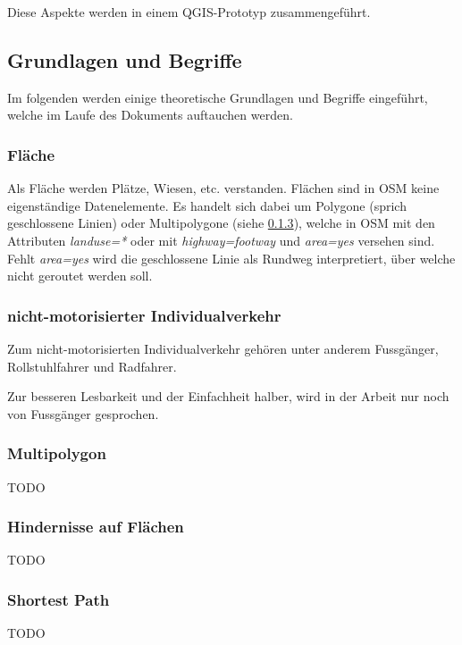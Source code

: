 Diese Aspekte werden in einem QGIS-Prototyp zusammengeführt.


\subsection{Grundlagen und Begriffe}
\label{Grundlagen und Begriffe}

Im folgenden werden einige theoretische Grundlagen und Begriffe eingeführt, welche im Laufe des Dokuments auftauchen werden.


\subsubsection{Fläche}
\label{Fläche}

Als Fläche werden Plätze, Wiesen, etc. verstanden. Flächen sind in \ac{OSM} keine eigenständige Datenelemente. Es handelt sich dabei um Polygone (sprich geschlossene Linien) oder Multipolygone (siehe \ref{Multipolygon}), welche in \ac{OSM} mit den Attributen \textit{landuse=*} oder mit \textit{highway=footway} und \textit{area=yes} versehen sind. Fehlt \textit{area=yes} wird die geschlossene Linie als Rundweg interpretiert, über welche nicht geroutet werden soll. \cite{osm_wiki_area}

\subsubsection{nicht-motorisierter Individualverkehr}
\label{nicht-motorisierter Individualverkehr}

Zum nicht-motorisierten Individualverkehr gehören unter anderem Fussgänger, Rollstuhlfahrer und Radfahrer.

Zur besseren Lesbarkeit und der Einfachheit halber, wird in der Arbeit nur noch von Fussgänger gesprochen.

\subsubsection{Multipolygon}
\label{Multipolygon}

TODO

\subsubsection{Hindernisse auf Flächen}
\label{Hindernisse in Flächen}

TODO %


\subsubsection{Shortest Path}
\label{Shortest Path}

TODO

